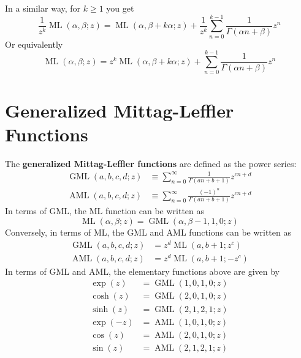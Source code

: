 In a similar way, for $k \geq 1$ you get
\begin{equation}
    \frac{1}{z^{k}} \operatorname{ML}(\alpha, \beta; z) = \operatorname{ML}(\alpha, \beta + k \alpha; z) + \frac{1}{z^{k}} \sum_{n = 0}^{k - 1} \frac{1}{\Gamma(\alpha n + \beta)} z^{n}
\end{equation}
Or equivalently
\begin{equation}
    \operatorname{ML}(\alpha, \beta; z) = z^{k} \operatorname{ML}(\alpha, \beta + k \alpha; z) + \sum_{n = 0}^{k - 1} \frac{1}{\Gamma(\alpha n + \beta)} z^{n}
\end{equation}
\section{Generalized Mittag-Leffler Functions}
The \textbf{generalized Mittag-Leffler functions} are defined as the power series:
\begin{align}
    \operatorname{GML}(a, b, c, d; z) &\equiv \sum_{n = 0}^{\infty} \frac{1}{\Gamma(a n + b + 1)} z^{cn+d} \\
    \operatorname{AML}(a, b, c, d; z) &\equiv \sum_{n = 0}^{\infty} \frac{(-1)^{n}}{\Gamma(a n + b + 1)} z^{cn+d}
\end{align}
In terms of GML, the ML function can be written as
\begin{equation}
    \operatorname{ML}(\alpha, \beta; z) = \operatorname{GML}(\alpha, \beta - 1, 1, 0; z)
\end{equation}
Conversely, in terms of ML, the GML and AML functions can be written as
\begin{align}
    \operatorname{GML}(a, b, c, d; z) &= z^{d} \operatorname{ML}\left(a, b+1; z^{c}\right) \\
    \operatorname{AML}(a, b, c, d; z) &= z^{d} \operatorname{ML}\left(a, b+1; -z^{c}\right)
\end{align}
In terms of GML and AML, the elementary functions above are given by
\begin{align}
    \exp(z) &= \operatorname{GML}(1, 0, 1, 0; z) \\
    \cosh(z) &= \operatorname{GML}(2, 0, 1, 0; z) \\
    \sinh(z) &= \operatorname{GML}(2, 1, 2, 1; z) \\
    \exp(-z) &= \operatorname{AML}(1, 0, 1, 0; z) \\
    \cos(z) &= \operatorname{AML}(2, 0, 1, 0; z) \\
    \sin(z) &= \operatorname{AML}(2, 1, 2, 1; z)
\end{align}
